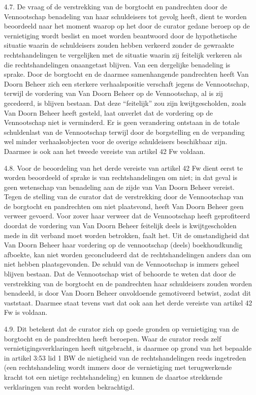 \documentclass[
  dutch,
  a4paper,
]{article}
\begin{document}
4.7. De vraag of de verstrekking van de borgtocht en pandrechten door de Vennootschap benadeling van haar schuldeisers tot gevolg heeft, dient te worden beoordeeld naar het moment waarop op het door de curator gedane beroep op de vernietiging wordt beslist en moet worden beantwoord door de hypothetische situatie waarin de schuldeisers zouden hebben verkeerd zonder de gewraakte rechtshandelingen te vergelijken met de situatie waarin zij feitelijk verkeren als die rechtshandelingen onaangetast blijven. Van een dergelijke benadeling is sprake. Door de borgtocht en de daarmee samenhangende pandrechten heeft Van Doorn Beheer zich een sterkere verhaalspositie verschaft jegens de Vennootschap, terwijl de vordering van Van Doorn Beheer op de Vennootschap, al is zij gecedeerd, is blijven bestaan. Dat deze ``feitelijk'' zou zijn kwijtgescholden, zoals Van Doorn Beheer heeft gesteld, laat onverlet dat de vordering op de Vennootschap niet is verminderd. Er is geen verandering ontstaan in de totale schuldenlast van de Vennootschap terwijl door de borgstelling en de verpanding wel minder verhaalsobjecten voor de overige schuldeisers beschikbaar zijn. Daarmee is ook aan het tweede vereiste van artikel 42 Fw voldaan.

4.8. Voor de beoordeling van het derde vereiste van artikel 42 Fw dient eerst te worden beoordeeld of sprake is van rechtshandelingen om niet; in dat geval is geen wetenschap van benadeling aan de zijde van Van Doorn Beheer vereist. Tegen de stelling van de curator dat de verstrekking door de Vennootschap van de borgtocht en pandrechten om niet plaatsvond, heeft Van Doorn Beheer geen verweer gevoerd. Voor zover haar verweer dat de Vennootschap heeft geprofiteerd doordat de vordering van Van Doorn Beheer feitelijk deels is kwijtgescholden mede in dit verband moet worden betrokken, faalt het. Uit de omstandigheid dat Van Doorn Beheer haar vordering op de vennootschap (deels) boekhoudkundig afboekte, kan niet worden geconcludeerd dat de rechtshandelingen anders dan om niet hebben plaatsgevonden. De schuld van de Vennootschap is immers geheel blijven bestaan. Dat de Vennootschap wist of behoorde te weten dat door de verstrekking van de borgtocht en de pandrechten haar schuldeisers zouden worden benadeeld, is door Van Doorn Beheer onvoldoende gemotiveerd betwist, zodat dit vaststaat. Daarmee staat tevens vast dat ook aan het derde vereiste van artikel 42 Fw is voldaan.

4.9. Dit betekent dat de curator zich op goede gronden op vernietiging van de borgtocht en de pandrechten heeft beroepen. Waar de curator reeds zelf vernietigingsverklaringen heeft uitgebracht, is daarmee op grond van het bepaalde in artikel 3:53 lid 1 BW de nietigheid van de rechtshandelingen reeds ingetreden (een rechtshandeling wordt immers door de vernietiging met terugwerkende kracht tot een nietige rechtshandeling) en kunnen de daartoe strekkende verklaringen van recht worden bekrachtigd.
\end{document}
